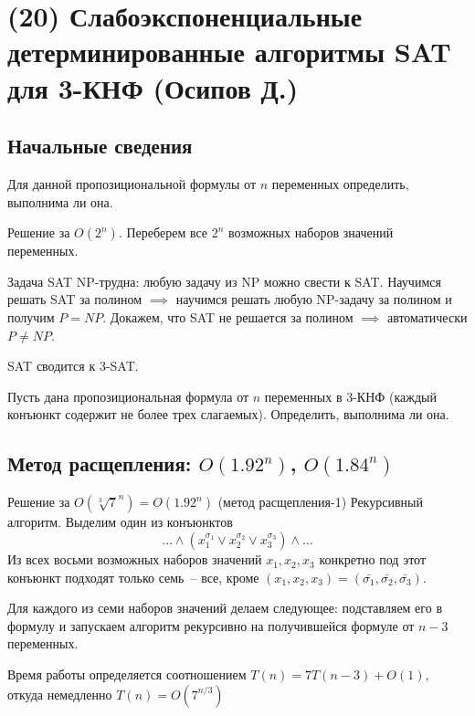 \hypertarget{3sat}{}
\section{(20) Слабоэкспоненциальные детерминированные алгоритмы SAT для 3-КНФ (Осипов Д.)}
\subsection{Начальные сведения}
\begin{problem*}[SAT]
Для данной пропозициональной формулы от $n$ переменных определить, выполнима ли она.
\end{problem*}

\begin{algodescription}{Решение за $O(2^n)$.}
    Переберем все $2^n$ возможных наборов значений переменных.
\end{algodescription}

\begin{nb*}
    Задача SAT NP-трудна: любую задачу из NP можно свести к SAT. Научимся решать SAT за полином $\implies$ научимся решать любую NP-задачу за полином и получим $P=NP$. Докажем, что SAT не решается за полином $\implies$ автоматически $P\neq NP$.
\end{nb*}

\begin{nb*} 
    SAT сводится к 3-SAT.
\end{nb*}

\begin{problem*}[3-SAT]
	Пусть дана пропозициональная формула от $n$ переменных в 3-КНФ (каждый конъюнкт содержит не более трех слагаемых). Определить, выполнима ли она.
\end{problem*}

\subsection{Метод расщепления: $O(1.92^n)$, $O(1.84^n)$}
\begin{algodescription}{Решение за $O\left(\sqrt[3]{7}^n\right) = O(1.92^n)$ (метод расщепления-1)}
    Рекурсивный алгоритм. Выделим один из конъюнктов $$\ldots\land(x_1^{\sigma_1} \lor x_2^{\sigma_2} \lor x_3^{\sigma_3})\land\ldots$$ Из всех восьми возможных наборов значений $x_1, x_2, x_3$ конкретно под этот конъюнкт подходят только семь~-- все, кроме $(x_1, x_2, x_3) = (\bar{\sigma_1}, \bar{\sigma_2}, \bar{\sigma_3})$.

    Для каждого из семи наборов значений делаем следующее: подставляем его в формулу и запускаем алгоритм рекурсивно на получившейся формуле от $n-3$ переменных.
    
    Время работы определяется соотношением $T(n) = 7T(n-3) + O(1)$, откуда немедленно $T(n) = O(7^{n/3})$
\end{algodescription}


